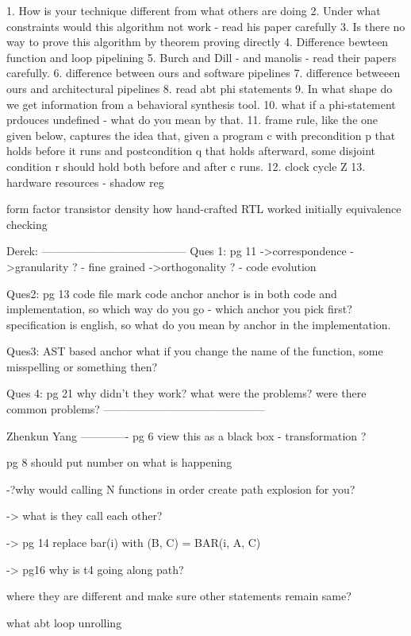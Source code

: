 1. How is your technique different from what others are doing
2. Under what constraints would this algorithm not work - read his paper carefully
3. Is there no way to prove this algorithm by theorem proving directly
4. Difference bewteen function and loop pipelining
5. Burch and Dill - and manolis - read their papers carefully.
6. difference between ours and software pipelines
7. difference betweeen ours and architectural pipelines
8. read abt phi statements
9. In what shape do we get information from a behavioral synthesis tool.
10. what if a phi-statement prdouces undefined - what do you mean by that.
11.  frame rule, like the one given below, captures the idea that, given a program c with precondition p that holds before it runs and postcondition q that holds afterward, some disjoint condition r should hold both before and after c runs.
12. clock cycle Z
13. hardware resources - shadow reg

form factor
transistor density
how hand-crafted RTL worked initially
equivalence checking


Derek:
---------------------------------------
Ques 1:
pg 11
->correspondence
->granularity ? - fine grained
->orthogonality ? - code evolution

Ques2:
pg 13
code file mark
code anchor
anchor is in both code and implementation, so which way do you go - which anchor you pick first? specification is english, so what do you mean by anchor in the implementation.

Ques3:
AST based anchor
what if you change the name of the function, some misspelling or something then?

Ques 4:
pg 21
why didn't they work? what were the problems? were there common problems?
--------------------------------------------

Zhenkun Yang
-------------
pg 6
view this as a black box - transformation ?

pg 8
should put number on what is happening

-?why would calling N functions in order create path explosion for you?

-> what is they call each other? 

-> pg 14
replace bar(i) with (B, C) = BAR(i, A, C)

-> pg16 why is t4 going along path?

where they are different and make sure other statements remain same?

what abt loop unrolling